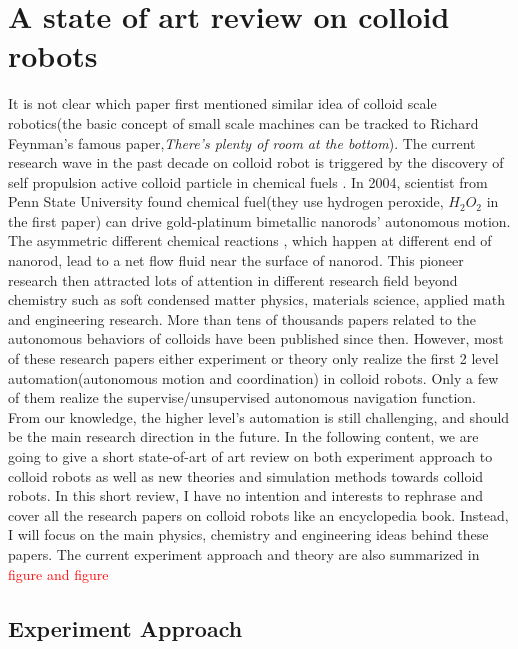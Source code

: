 \section{A state of art review on colloid robots }
It is not clear which paper first mentioned  similar idea of colloid scale robotics(the basic concept of  small scale machines can be tracked to Richard Feynman's famous paper,\textit{There's plenty of room at the bottom}\cite{feynman1960there}). The current research wave in the past decade on colloid robot is triggered by the discovery of self propulsion active colloid particle in chemical fuels \cite{paxton2004catalytic}. In 2004, scientist from Penn State University found chemical fuel(they use hydrogen peroxide, $H_2O_2$ in the first paper) can drive  gold-platinum bimetallic nanorods' autonomous motion. The asymmetric different chemical reactions , which happen at different end of nanorod,  lead to a net flow fluid near the surface of nanorod. This pioneer research then attracted lots of attention in different research field beyond chemistry such as soft condensed matter physics\cite{Marchetti2013}, materials science\cite{han2018engineering}, applied math\cite{fodor2016far} and engineering research\cite{sitti2015biomedical}. More than tens of thousands papers related to the autonomous behaviors of colloids have been published since then. However, most of these research papers either experiment or theory only realize the first 2 level automation(autonomous motion and coordination) in colloid robots. Only a few of them realize the supervise/unsupervised autonomous navigation function. From our knowledge, the higher level's automation is still challenging, and should be the main research direction in the future. In the following content, we are going to give a short state-of-art of art review on both experiment approach to colloid robots as well as new theories and simulation methods towards colloid robots. In this short review, I have no intention and interests to rephrase and cover all the research papers on colloid robots like an encyclopedia book. Instead,  I will focus on the main physics, chemistry and engineering ideas behind these papers. The current experiment approach and theory are also summarized in \textcolor{red}{figure and figure}  

\subsection{Experiment Approach}

